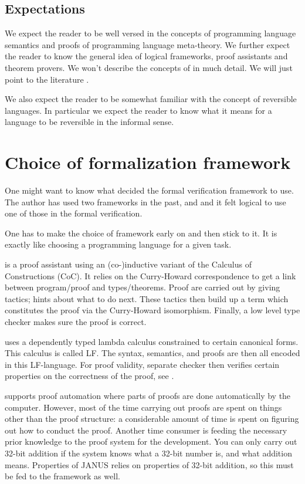 \subsection{Expectations}

We expect the reader to be well versed in the concepts of programming
language semantics and proofs of programming language meta-theory. We
further expect the reader to know the general idea of logical
frameworks, proof assistants and theorem provers. We won't describe
the concepts of \coq{} in much detail. We will just point to the
literature .

We also expect the reader to be somewhat familiar with the concept of
reversible languages. In particular we expect the reader to know what
it means for a language to be reversible in the informal sense.

\section{Choice of formalization framework}
\label{sec:thm-prover-choice}

One might want to know what decided the formal verification framework
to use. The author has used two frameworks in the past, \coq{} and \twelf{}
and it felt logical to use one of those in the formal verification.

One has to make the choice of framework early on and then stick to
it. It is exactly like choosing a programming language for a given
task.

\coq{} is a proof assistant using an (co-)inductive variant of the
Calculus of Constructions (CoC). It relies on the Curry-Howard
correspondence to get a link between program/proof and
types/theorems. Proof are carried out by giving tactics; hints about
what to do next. These tactics then build up a term which constitutes
the proof via the Curry-Howard isomorphism. Finally, a low level type
checker makes sure the proof is correct.

\twelf{} uses a dependently typed lambda calculus constrained to
certain canonical forms. This calculus is called LF. The syntax,
semantics, and proofs are then all encoded in this LF-language. For
proof validity, separate checker then verifies certain properties on
the correctness of the proof, see \cite{harper+05:how-to-believe,
  harper+07:mechanizing}.

\coq{} supports proof automation where parts of proofs are done
automatically by the computer. However, most of the time carrying out
proofs are spent on things other than the proof structure: a
considerable amount of time is spent on figuring out how to conduct
the proof. Another time consumer is feeding the necessary prior
knowledge to the proof system for the development. You can only carry
out 32-bit addition if the system knows what a 32-bit
number is, and what addition means. Properties of JANUS relies on
properties of 32-bit addition, so this must be fed to the framework as
well.

